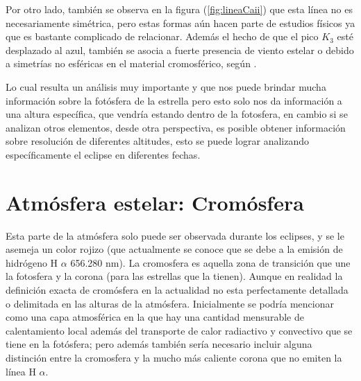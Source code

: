 \documentclass[12pt,oneside,openany,letter]{book}
\begin{document}
\noindent Por otro lado, también se observa en la figura (\ref{fig:lineaCaii}) que esta línea no es necesariamente simétrica, pero estas formas aún hacen parte de estudios físicos ya que es bastante complicado de relacionar. Además el hecho de que el pico $K_3$ esté desplazado al azul, también se asocia a fuerte presencia de viento estelar o debido a simetrías no esféricas en el material cromosférico, según \citep{linsky1980stellar}.

Lo cual resulta un análisis muy importante y que nos puede brindar mucha información sobre la fotósfera de la estrella pero esto solo nos da información a una altura específica, que vendría estando dentro de la fotosfera, en cambio si se analizan otros elementos, desde otra perspectiva, es posible obtener información sobre resolución de diferentes altitudes, esto se puede lograr analizando específicamente el eclipse en diferentes fechas.


\section{Atmósfera estelar: Cromósfera}

Esta parte de la atmósfera solo puede ser observada durante los eclipses, y se le asemeja un color rojizo (que actualmente se conoce que se debe a la emisión de hidrógeno H $\alpha$ 656.280 nm). La cromosfera es aquella zona de transición que une la fotosfera y la corona (para las estrellas que la tienen).  Aunque en realidad la definición exacta de cromósfera en la actualidad no esta perfectamente detallada o delimitada en las alturas de la atmósfera. Inicialmente se podría mencionar como una capa atmosférica en la que hay una cantidad mensurable de calentamiento local además del transporte de calor radiactivo y convectivo que se tiene en la fotósfera; pero además también sería necesario incluir alguna distinción entre la cromosfera y la mucho más caliente corona que no emiten la línea H $\alpha$. 
\end{document}
